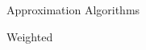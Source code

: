 \begin{frame}
\vfill
\begin{center}
\Huge 
Approximation Algorithms

\vspace{1cm}

\huge
Weighted
\end{center}
\vfill
\end{frame}